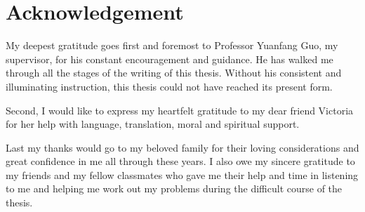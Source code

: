 \chapter*{Acknowledgement}

My deepest gratitude goes first and foremost to Professor Yuanfang Guo, my supervisor, for his constant encouragement and guidance. He has walked me through all the stages of the writing of this thesis. Without his consistent and illuminating instruction, this thesis could not have reached its present form.

Second, I would like to express my heartfelt gratitude to my dear friend Victoria for her help with language, translation, moral and spiritual support.

Last my thanks would go to my beloved family for their loving considerations and great confidence in me all through these years. I also owe my sincere gratitude to my friends and my fellow classmates who gave me their help and time in listening to me and helping me work out my problems during the difficult course of the thesis.

